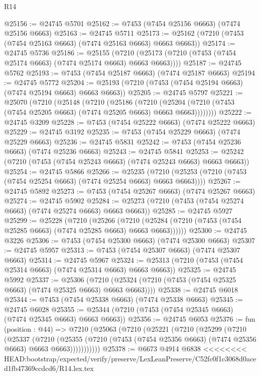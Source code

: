 \begin{lexlean}{R14}
\begin{coremodule}
{{{{{{{{{{{{{{{{{{{{{{{{{{{{{{{{{{{{{{{{{{{{{{{{{{{{{{{{{{{{{{{{{{{{{{{{{{{{{{{{{{@25156 := @24745 @5701
@25162 := @7453 (@7454 @25156 @6663) (@7474 @25156 @6663)
@25163 := @24745 @5711
@25173 := @25162 (@7210 (@7453 (@7454 @25163 @6663) (@7474 @25163 @6663) @6663 @6663))
@25174 := @24745 @5736
@25186 := @25155
    (@7210 (@25173 (@7210 (@7453 (@7454 @25174 @6663) (@7474 @25174 @6663) @6663 @6663))))
@25187 := @24745 @5762
@25193 := @7453 (@7454 @25187 @6663) (@7474 @25187 @6663)
@25194 := @24745 @5772
@25204 := @25193 (@7210 (@7453 (@7454 @25194 @6663) (@7474 @25194 @6663) @6663 @6663))
@25205 := @24745 @5797
@25221 := @25070
    (@7210
      (@25148
        (@7210
          (@25186
            (@7210
              (@25204 (@7210 (@7453 (@7454 @25205 @6663) (@7474 @25205 @6663) @6663 @6663))))))))
@25222 := @24745 @3209
@25228 := @7453 (@7454 @25222 @6663) (@7474 @25222 @6663)
@25229 := @24745 @3192
@25235 := @7453 (@7454 @25229 @6663) (@7474 @25229 @6663)
@25236 := @24745 @5831
@25242 := @7453 (@7454 @25236 @6663) (@7474 @25236 @6663)
@25243 := @24745 @5841
@25253 := @25242 (@7210 (@7453 (@7454 @25243 @6663) (@7474 @25243 @6663) @6663 @6663))
@25254 := @24745 @5866
@25266 := @25235
    (@7210 (@25253 (@7210 (@7453 (@7454 @25254 @6663) (@7474 @25254 @6663) @6663 @6663))))
@25267 := @24745 @5892
@25273 := @7453 (@7454 @25267 @6663) (@7474 @25267 @6663)
@25274 := @24745 @5902
@25284 := @25273 (@7210 (@7453 (@7454 @25274 @6663) (@7474 @25274 @6663) @6663 @6663))
@25285 := @24745 @5927
@25299 := @25228
    (@7210
      (@25266
        (@7210 (@25284 (@7210 (@7453 (@7454 @25285 @6663) (@7474 @25285 @6663) @6663 @6663))))))
@25300 := @24745 @3226
@25306 := @7453 (@7454 @25300 @6663) (@7474 @25300 @6663)
@25307 := @24745 @5957
@25313 := @7453 (@7454 @25307 @6663) (@7474 @25307 @6663)
@25314 := @24745 @5967
@25324 := @25313 (@7210 (@7453 (@7454 @25314 @6663) (@7474 @25314 @6663) @6663 @6663))
@25325 := @24745 @5992
@25337 := @25306
    (@7210 (@25324 (@7210 (@7453 (@7454 @25325 @6663) (@7474 @25325 @6663) @6663 @6663))))
@25338 := @24745 @6018
@25344 := @7453 (@7454 @25338 @6663) (@7474 @25338 @6663)
@25345 := @24745 @6028
@25355 := @25344 (@7210 (@7453 (@7454 @25345 @6663) (@7474 @25345 @6663) @6663 @6663))
@25356 := @24745 @6053
@25376 := fun (position : @44) =>
  @7210
    (@25063
      (@7210
        (@25221
          (@7210
            (@25299
              (@7210
                (@25337
                  (@7210
                    (@25355
                      (@7210 (@7453 (@7454 @25356 @6663) (@7474 @25356 @6663) @6663 @6663)))))))))))
@25378 := @6673 @4914 @6838
<<<<<<<< HEAD:bootstrap/expected/verify/preserve/LexLeanPreserve/C52fc0f1c3068d0aced1fb47369ccdcd6/R14.lex.tex
}}}}}}}}}}}}}}}}}}}}}}}}}}}}}}}}}}}}}}}}}}}}}}}}}}}}}}}}}}}}}}}}}}}}}}}}}}}}}}}}}}
\end{coremodule}
\end{lexlean}
